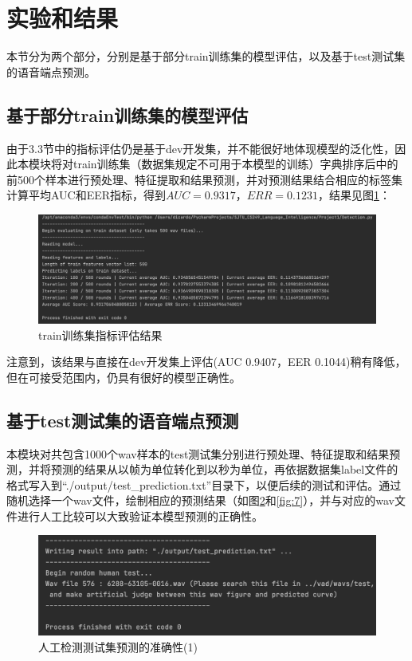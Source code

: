 \documentclass[a4paper]{article}
\begin{document}
\section{实验和结果}

本节分为两个部分，分别是基于部分train训练集的模型评估，以及基于test测试集的语音端点预测。

\subsection{基于部分train训练集的模型评估}

由于3.3节中的指标评估仍是基于dev开发集，并不能很好地体现模型的泛化性，因此本模块将对train训练集（数据集规定不可用于本模型的训练）字典排序后中的前500个样本进行预处理、特征提取和结果预测，并对预测结果结合相应的标签集计算平均AUC和EER指标，得到$AUC=0.9317$，$ERR=0.1231$，结果见图\ref{fig:5}：

\begin{figure}[htb]
  \centering
  \includegraphics[scale=0.21]{figs/test on train dataset.png}
  \caption{train训练集指标评估结果}
  \label{fig:5}
\end{figure} 

注意到，该结果与直接在dev开发集上评估(AUC 0.9407，EER 0.1044)稍有降低，但在可接受范围内，仍具有很好的模型正确性。

\subsection{基于test测试集的语音端点预测}

本模块对共包含1000个wav样本的test测试集分别进行预处理、特征提取和结果预测，并将预测的结果从以帧为单位转化到以秒为单位，再依据数据集label文件的格式写入到“./output/test\_prediction.txt”目录下，以便后续的测试和评估。通过随机选择一个wav文件，绘制相应的预测结果（如图\ref{fig:6}和\ref{fig:7}），并与对应的wav文件进行人工比较可以大致验证本模型预测的正确性。

\begin{figure}[htb]
  \centering
  \includegraphics[scale=0.35]{figs/human_test.png}
  \caption{人工检测测试集预测的准确性(1)}
  \label{fig:6}
\end{figure} 
\end{document}

